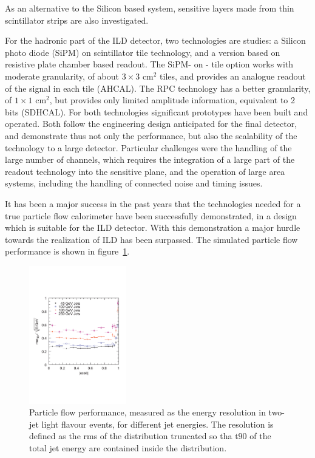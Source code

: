 \documentclass[%
 amsmath,amssymb,
 aps,
]{revtex4-1}
\begin{document}
As an alternative to the Silicon based system, sensitive layers made from thin scintillator strips are also investigated. 

For the hadronic part of the ILD detector, two technologies are studies: a Silicon photo diode (SiPM) on scintillator tile technology, and a version based on resistive plate chamber based readout. The SiPM- on - tile option works with moderate granularity, of about $3 \times 3$ cm$^2$ tiles, and provides an analogue readout of the signal in each tile (AHCAL). The RPC technology has a better granularity, of $1 \times 1$ cm$^2$, but provides only limited amplitude information, equivalent to 2 bits (SDHCAL). For both technologies significant prototypes have been built and operated. Both follow the engineering design anticipated for the final detector, and demonstrate thus not only the performance, but also the scalability of the technology to a large detector. Particular challenges were the handling of the large number of channels, which requires the integration of a large part of the readout technology into the sensitive plane, and the operation of large area systems, including the handling of connected noise and timing issues. 

It has been a major success in the past years that the technologies needed for a true particle flow calorimeter have been successfully demonstrated, in a design which is suitable for the ILD detector. With this demonstration a major hurdle towards the realization of ILD has been surpassed. The simulated particle flow performance is shown in figure~\ref{fig:pflow}.
\begin{figure}[th]
    \centering
    \includegraphics[height=6cm]{figures/pflow.pdf}
    \caption{Particle flow performance, measured as the energy resolution in two-jet light flavour events, for different jet energies. The resolution is defined as the rms of the distribution truncated so tha t$90$ of the total jet energy are contained inside the distribution.}
    \label{fig:pflow}
\end{figure}
\end{document}
